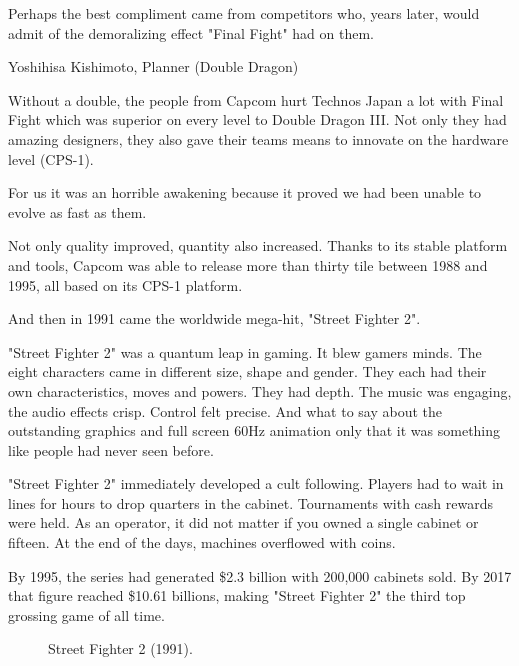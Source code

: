 Perhaps the best compliment came from competitors who, years later, would admit of the demoralizing effect "Final Fight" had on them.

\begin{q}{Yoshihisa Kishimoto, Planner\cite{dd} (Double Dragon)}
  

  Without a double, the people from Capcom hurt Technos Japan a lot with Final Fight which was superior on every level to Double Dragon III. Not only they had amazing designers, they also gave their teams means to innovate on the hardware level (CPS-1). 

  For us it was an horrible awakening because it proved we had been unable to evolve as fast as them.
  \end{q}



Not only quality improved, quantity also increased. Thanks to its stable platform and tools, Capcom was able to release more than thirty tile between 1988 and 1995, all based on its CPS-1 platform.

And then in 1991 came the worldwide mega-hit, "Street Fighter 2".

"Street Fighter 2" was a quantum leap in gaming. It blew gamers minds. The eight characters came in different size, shape and gender. They each had their own characteristics, moves and powers. They had depth. The music was engaging, the audio effects crisp. Control felt precise. And what to say about the outstanding graphics and full screen 60Hz animation only that it was something like people had never seen before.


"Street Fighter 2" immediately developed a cult following. Players had to wait in lines for hours to drop quarters in the cabinet. Tournaments with cash rewards were held. As an operator, it did not matter if you owned a single cabinet or fifteen\cite{sf2_oral_history}. At the end of the days, machines overflowed with coins.


By 1995, the series had generated \$2.3 billion with 200,000 cabinets sold\cite{usgamer20160101}. By 2017 that figure reached \$10.61 billions\cite{gamerevolution20140126}, making "Street Fighter 2" the third top grossing game of all time.

\label{nin_sf2}
\begin{figure}[H]
\caption*{Street Fighter 2 (1991).}
\end{figure}


